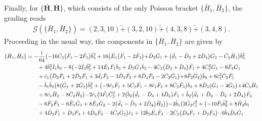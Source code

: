 \documentclass[10pt]{amsart}
\theoremstyle{definition}
\theoremstyle{corollary}
\theoremstyle{remark}
\theoremstyle{conclusion}
\begin{document}
Finally, for $\{\bar{\textbf{H}},\bar{\textbf{H}}\}$, which consists of the only Poisson bracket $\{\bar{H}_1,\bar{H}_2\}$, the grading reads
\begin{align}
    \mathcal{G} \left(\{\bar{H}_1,\bar{H}_2\}\right) = (2,3,10) \tilde{+}  (3,2,10) \tilde{+}  (4,3,8) \tilde{+}  (3,4,8) . \label{eq:grah1h2}
\end{align} 
 Proceeding in the usual way, the components in $\{\bar{H}_1,\bar{H}_2\}$ are given by
\begin{align}
\{\bar{H}_1, \bar{H}_2\}&=-\frac{{\rm i}}{64}  \bigl(-16 \bar{C}_2 \bigl(\bar{F}_1-2 \bar{F}_3\bigl) \bar{b}_3^3+16 \bigl(\bar{E}_1 \bigl(\bar{F}_1-2 \bar{F}_3\bigl)+\bar{D}_2 \bar{G}_1+\bigl(\bar{d}_1-\bar{D}_3+2 \bar{D}_4\bigl) \bar{G}_2-\bar{C}_2 \bar{H}_1\bigl) \bar{b}_3^2\nonumber \\
& \hskip 0.7cm+4 \bar{b}_1^2 \bar{I}_1 \bar{b}_3-8 \bigl(-2 \bar{I}_2 \bar{b}_2^2+14 \bar{E}_1 \bar{F}_1 \bar{b}_2+\bar{D}_2 \bar{G}_1 \bar{b}_2-4 \bar{C}_2 \bigl(\bar{D}_2+\bar{D}_4\bigl) \bar{F}_1+4 \bar{C}_2^2 \bar{G}_1-8 \bar{F}_4 \bar{G}_1\nonumber \\
& \hskip 0.7cm+\bar{c}_1 \bigl(\bar{D}_2 \bar{F}_1+2 \bar{D}_3 \bar{F}_1+3 \bar{d}_1 \bar{F}_3-3 \bar{D}_3 \bar{F}_3+6 \bar{D}_4 \bar{F}_3-2 \bar{C}_2 \bar{G}_1\bigl)+8 \bar{F}_2 \bar{G}_2\bigl) \bar{b}_3+6 \bar{c}_1^2 \bar{C}_2 \bar{F}_1\nonumber \\
& \hskip 0.7cm-\bar{b}_1 \bar{b}_2 \bigl(8 \bigl(\bar{G}_1+2 \bar{G}_2\bigl) \bar{b}_3^2+\bigl(-9 \bar{c}_1 \bar{F}_1+5 \bar{C}_2 \bar{F}_1-8 \bar{c}_1 \bar{F}_3+8 \bar{C}_2 \bar{F}_3\bigl) \bar{b}_3+8 \bar{D}_4 \bigl(\bar{G}_1-4 \bar{G}_2\bigl)+4 \bar{C}_2 \bar{H}_1\nonumber \\
& \hskip 0.7cm+8 \bar{c}_1 \bar{H}_2-8 \bar{C}_2 \bar{H}_2\bigl)-2 \bar{c}_1 \bigl(3 \bar{F}_1 \bar{C}_2^2+2 \bigl(\bar{b}_2 \bigl(\bar{d}_1-\bar{D}_3+4 \bar{D}_4\bigl) \bar{F}_1+\bar{b}_2 \bigl(\bar{d}_1+\bar{D}_2-\bar{D}_3+2 \bar{D}_4\bigl) \bar{F}_3 \nonumber \\
& \hskip 0.7cm-6 \bar{F}_2 \bar{F}_3-6 \bar{E}_1 \bar{G}_1+8 \bar{E}_1 \bar{G}_2-2 \bigl(\bar{d}_1-\bar{D}_3+2 \bar{D}_4\bigl) \bar{H}_2\bigl)\bigl)-2 \bar{b}_1 \bigl(2 \bar{G}_2 \bar{c}_1^2+\bigl(-10 \bar{F}_3 \bar{b}_3^2+8 \bar{H}_2 \bar{b}_3 \nonumber \\
& \hskip 0.7cm+4 \bar{D}_3 \bar{F}_1+\bar{D}_2 \bar{F}_3+4 \bar{D}_4 \bar{F}_3-4 \bar{C}_2 \bar{G}_2\bigl) \bar{c}_1+12 \bar{b}_3 \bar{E}_1 \bar{F}_3-2 \bar{C}_2 \bigl(\bar{D}_3 \bar{F}_1+\bar{D}_2 \bar{F}_3\bigl)-6 \bar{b}_3 \bar{D}_3 \bar{G}_1 \nonumber \\

\end{align}
\end{document}
